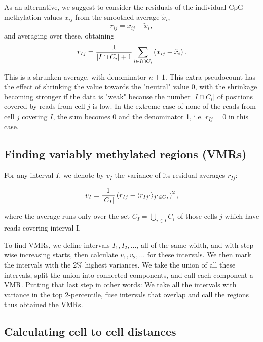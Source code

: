 \documentclass[twocolumn,10pt]{article}
\begin{document}
As an alternative, we suggest to consider the residuals of the individual CpG methylation values $x_{ij}$ from the smoothed average $\tilde x_i$,
$$ r_{ij} = x_{ij} - \tilde x_i, $$
and averaging over these, obtaining
\begin{equation} 
r_{Ij} = \frac{\scriptsize{1}}{\scriptsize{|I\cap C_i|+1}}\sum_{i\in I\cap C_i}\left( x_{ij} - \tilde x_i \right). \label{avgres}
\end{equation}

This is a shrunken average, with denominator $n+1$. This extra pseudocount has the effect of shrinking the value towards the "neutral" value 0, with the shrinkage becoming stronger if the data is "weak" because the number $|I\cap C_i|$ of positions covered by reads from cell $j$  is low. In the extreme case of none of the reads from cell $j$ covering $I$, the sum becomes 0 and the denominator 1, i.e. $r_{Ij}=0$ in this case.

\subsection{Finding variably methylated regions (VMRs)}

For any interval $I$, we denote by $v_I$ the variance of its residual averages $r_{Ij}$:

$$ v_I = \frac{\scriptsize{1}}{\scriptsize{|C_I|}}\left( r_{Ij} - \langle r_{Ij'}\rangle_{j'\in C_I} \right)^2,$$

where the average runs only over the set $C_I=\bigcup_{i\in I}C_i$ of those cells $j$ which have reads covering interval I.

To find VMRs, we define intervals $I_1, I_2, ...$, all of the same width, and with step-wise increasing starts, then calculate $v_1, v_2, ...$ for these intervals. We then mark the intervals with the 2\% highest variances. We take the union of all these intervals, split the union into connected components, and call each component a VMR. Putting that last step in other words: We take all the intervals with variance in the top 2-percentile, fuse intervals that overlap and call the regions thus obtained the VMRs.

\subsection{Calculating cell to cell distances}
\end{document}
